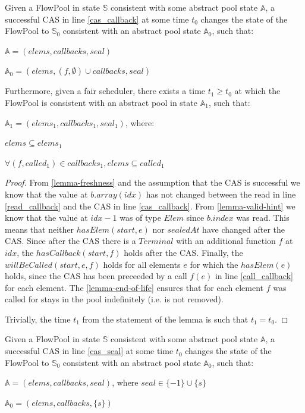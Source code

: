 \documentclass[runningheads,a4paper]{llncs}
\begin{document}
\begin{lemma}\label{lemma-foreach}
Given a FlowPool in state $\mathbb{S}$ consistent with some abstract pool state $\mathbb{A}$, 
a successful CAS in line \ref{cas_callback} at some time $t_0$ changes the state of the FlowPool 
to $\mathbb{S}_0$ consistent with an abstract pool state $\mathbb{A}_0$, such that:

$\mathbb{A} = (elems, callbacks, seal)$

$\mathbb{A}_0 = (elems, (f, \emptyset) \cup callbacks, seal)$

Furthermore, given a fair scheduler, there exists a time $t_1 \geq t_0$ at which the FlowPool 
is consistent with an abstract pool in state $\mathbb{A}_1$, such that:

$\mathbb{A}_1 = (elems_1, callbacks_1, seal_1)$, where:

$elems \subseteq elems_1$

$\forall (f, called_1) \in callbacks_1, elems \subseteq called_1$
\end{lemma}

\begin{proof}
From \ref{lemma-freshness} and the assumption that the CAS is
successful we know that the value at $b.array(idx)$ has not changed
between the read in line \ref{read_callback} and the CAS in line
\ref{cas_callback}.
From \ref{lemma-valid-hint} we know that the value at $idx - 1$
was of type $Elem$ since $b.index$ was read.
This means that neither $hasElem(start, e)$ nor $sealedAt$ have changed after the CAS.
Since after the CAS there is a $Terminal$ with an additional function $f$ at $idx$,
the $hasCallback(start, f)$ holds after the CAS.
Finally, the $willBeCalled(start, e, f)$ holds for all elements $e$
for which the $hasElem(e)$ holds, since the CAS has been preceeded by
a call $f(e)$ in line \ref{call_callback} for each element. The 
\ref{lemma-end-of-life} ensures that for each element $f$ was called
for stays in the pool indefinitely (i.e. is not removed).

Trivially, the time $t_1$ from the statement of the lemma is such that $t_1 = t_0$.
\end{proof}


\begin{lemma}\label{lemma-seal}
Given a FlowPool in state $\mathbb{S}$ consistent with some abstract pool state $\mathbb{A}$, 
a successful CAS in line \ref{cas_seal} at some time $t_0$ changes the state of the FlowPool 
to $\mathbb{S}_0$ consistent with an abstract pool state $\mathbb{A}_0$, such that:

$\mathbb{A} = (elems, callbacks, seal)$, where $seal \in \{ -1 \} \cup
\{ s \}$

$\mathbb{A}_0 = (elems, callbacks, \{ s \})$
\end{lemma}
\end{document}
